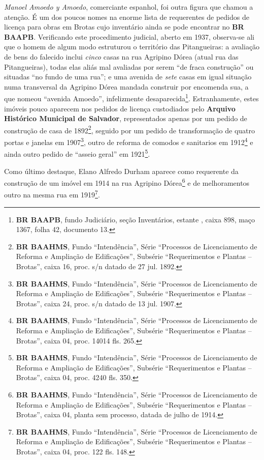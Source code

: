 \textit{Manoel Amoedo y Amoedo}, comerciante espanhol, foi outra figura que chamou a atenção. É um dos poucos nomes na enorme lista de requerentes de pedidos de licença para obras em Brotas cujo inventário ainda se pode encontrar no \textbf{BR BAAPB}. Verificando este procedimento judicial, aberto em 1937, observa-se ali que o homem de algum modo estruturou o território das Pitangueiras: a avaliação de bens do falecido inclui \textit{cinco} casas na rua Agripino Dórea (atual rua das Pitangueiras), todas elas aliás mal avaliadas por serem ``de fraca construção'' ou situadas ``no fundo de uma rua''; e uma avenida de \textit{sete} casas em igual situação numa transversal da Agripino Dórea mandada construir por encomenda sua, a que nomeou ``avenida Amoedo'', infelizmente desaparecida\footnote{\textbf{BR BAAPB}, fundo Judiciário, seção Inventários, estante , caixa 898, maço 1367, folha 42, documento 13.}. Estranhamente, estes imóveis pouco aparecem nos pedidos de licença custodiados pelo \textbf{Arquivo Histórico Municipal de Salvador}, representados apenas por um pedido de construção de casa de 1892\footnote{\textbf{BR BAAHMS}, Fundo ``Intendência'', Série ``Processos de Licenciamento de Reforma e Ampliação de Edificações'', Subsérie ``Requerimentos e Plantas -- Brotas'', caixa 16, proc. s/n datado de 27 jul. 1892.}, seguido por um pedido de transformação de quatro portas e janelas em 1907\footnote{\textbf{BR BAAHMS}, Fundo ``Intendência'', Série ``Processos de Licenciamento de Reforma e Ampliação de Edificações'', Subsérie ``Requerimentos e Plantas -- Brotas'', caixa 24, proc. s/n datado de 13 jul. 1907.}, outro de reforma de comodos e sanitarios em 1912\footnote{\textbf{BR BAAHMS}, Fundo ``Intendência'', Série ``Processos de Licenciamento de Reforma e Ampliação de Edificações'', Subsérie ``Requerimentos e Plantas -- Brotas'', caixa 04, proc. 14014 fls. 265.} e ainda outro pedido de ``asseio geral'' em 1921\footnote{\textbf{BR BAAHMS}, Fundo ``Intendência'', Série ``Processos de Licenciamento de Reforma e Ampliação de Edificações'', Subsérie ``Requerimentos e Plantas -- Brotas'', caixa 04, proc. 4240 fls. 350.}.

Como último destaque, Elano Alfredo Durham aparece como requerente da construção de um imóvel em 1914 na rua Agripino Dórea\footnote{\textbf{BR BAAHMS}, Fundo ``Intendência'', Série ``Processos de Licenciamento de Reforma e Ampliação de Edificações'', Subsérie ``Requerimentos e Plantas -- Brotas'', caixa 04, planta sem processo, datada de julho de 1914.} e de melhoramentos outro na mesma rua em 1919\footnote{\textbf{BR BAAHMS}, Fundo ``Intendência'', Série ``Processos de Licenciamento de Reforma e Ampliação de Edificações'', Subsérie ``Requerimentos e Plantas -- Brotas'', caixa 04, proc. 122 fls. 148.}.

